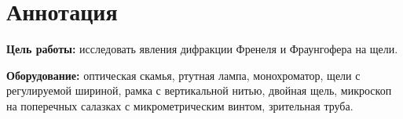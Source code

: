 \section{Аннотация}
\textbf{Цель работы:}
исследовать явления дифракции Френеля и Фраунгофера на щели.

\textbf{Оборудование:}
оптическая скамья, ртутная лампа, монохроматор, щели с регулируемой шириной, рамка с вертикальной нитью, двойная щель, микроскоп на поперечных салазках с микрометрическим винтом, зрительная труба.
